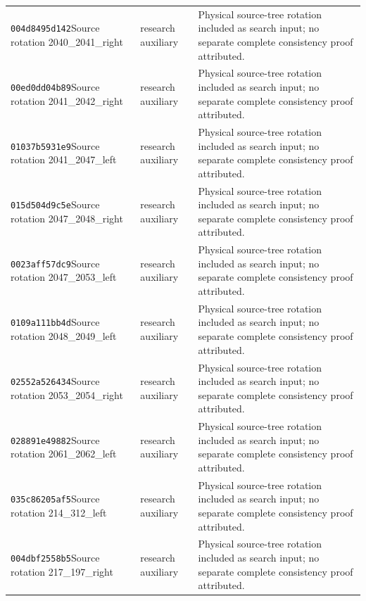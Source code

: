 {\begin{longtable}{@{}>{\raggedright\arraybackslash}p{}>{\raggedright\arraybackslash}p{}>{\raggedright\arraybackslash}p{}@{}}
\texttt{004d8495d142}\newline Source rotation 2040\_2041\_right & research auxiliary & Physical source-tree rotation included as search input; no separate complete consistency proof attributed.\\
\texttt{00ed0dd04b89}\newline Source rotation 2041\_2042\_right & research auxiliary & Physical source-tree rotation included as search input; no separate complete consistency proof attributed.\\
\texttt{01037b5931e9}\newline Source rotation 2041\_2047\_left & research auxiliary & Physical source-tree rotation included as search input; no separate complete consistency proof attributed.\\
\texttt{015d504d9c5e}\newline Source rotation 2047\_2048\_right & research auxiliary & Physical source-tree rotation included as search input; no separate complete consistency proof attributed.\\
\texttt{0023aff57dc9}\newline Source rotation 2047\_2053\_left & research auxiliary & Physical source-tree rotation included as search input; no separate complete consistency proof attributed.\\
\texttt{0109a111bb4d}\newline Source rotation 2048\_2049\_left & research auxiliary & Physical source-tree rotation included as search input; no separate complete consistency proof attributed.\\
\texttt{02552a526434}\newline Source rotation 2053\_2054\_right & research auxiliary & Physical source-tree rotation included as search input; no separate complete consistency proof attributed.\\
\texttt{028891e49882}\newline Source rotation 2061\_2062\_left & research auxiliary & Physical source-tree rotation included as search input; no separate complete consistency proof attributed.\\
\texttt{035c86205af5}\newline Source rotation 214\_312\_left & research auxiliary & Physical source-tree rotation included as search input; no separate complete consistency proof attributed.\\
\texttt{004dbf2558b5}\newline Source rotation 217\_197\_right & research auxiliary & Physical source-tree rotation included as search input; no separate complete consistency proof attributed.\\

\end{longtable}}
